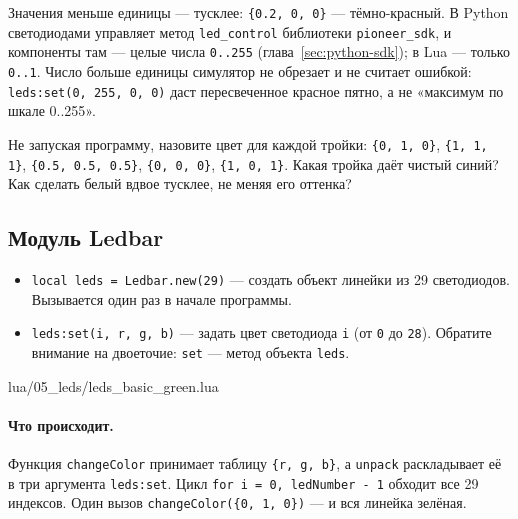 Значения меньше единицы --- тусклее: \verb|{0.2, 0, 0}| --- тёмно-красный. В Python светодиодами управляет метод \verb|led_control| библиотеки \texttt{pioneer\_sdk}, и компоненты там --- целые числа \verb|0..255| (глава~\ref{sec:python-sdk}); в Lua --- только \verb|0..1|. Число больше единицы симулятор не обрезает и не считает ошибкой: \verb|leds:set(0, 255, 0, 0)| даст пересвеченное красное пятно, а не «максимум по шкале 0..255».

\begin{taskbox}
Не запуская программу, назовите цвет для каждой тройки: \verb|{0, 1, 0}|, \verb|{1, 1, 1}|, \verb|{0.5, 0.5, 0.5}|, \verb|{0, 0, 0}|, \verb|{1, 0, 1}|. Какая тройка даёт чистый синий? Как сделать белый вдвое тусклее, не меняя его оттенка?
\end{taskbox}

\subsection{Модуль Ledbar}

\begin{codebox}
\begin{itemize}
  \item \verb|local leds = Ledbar.new(29)| --- создать объект линейки из 29 светодиодов. Вызывается один раз в начале программы.
  \item \verb|leds:set(i, r, g, b)| --- задать цвет светодиода \verb|i| (от \verb|0| до \verb|28|). Обратите внимание на двоеточие: \verb|set| --- метод объекта \verb|leds|.
\end{itemize}
\end{codebox}

\begin{codefile}{lua/05_leds/leds_basic_green.lua}
\end{codefile}

\paragraph{Что происходит.} Функция \verb|changeColor| принимает таблицу \verb|{r, g, b}|, а \verb|unpack| раскладывает её в три аргумента \verb|leds:set|. Цикл \verb|for i = 0, ledNumber - 1| обходит все 29 индексов. Один вызов \verb|changeColor({0, 1, 0})| --- и вся линейка зелёная.

